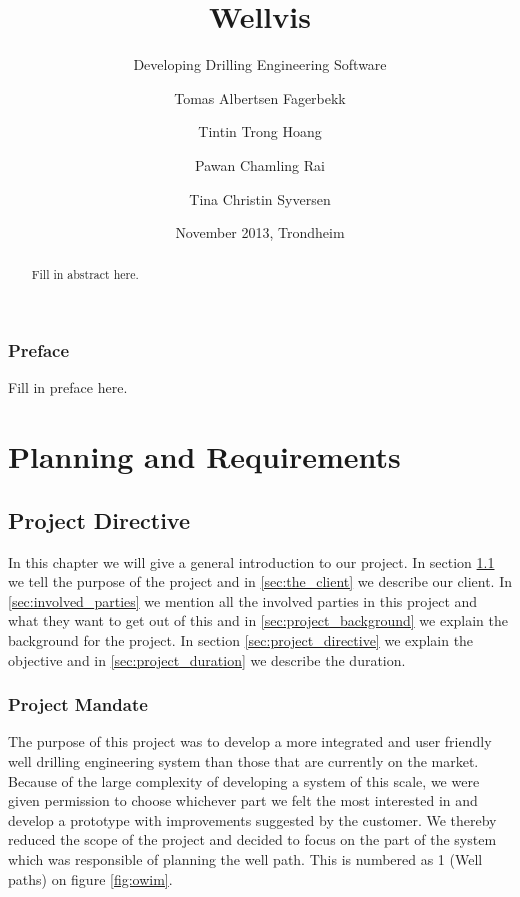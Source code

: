 \documentclass{report}
\title{Wellvis}
\subtitle{Developing Drilling Engineering Software}
\author{Tomas Albertsen Fagerbekk \and Tintin Trong Hoang \and Pawan Chamling Rai \and Tina Christin Syversen}
\date{November 2013, Trondheim}
\begin{document}
\maketitle

\section*{Preface}
Fill in preface here.

\begin{abstract}
Fill in abstract here.
\end{abstract}

\tableofcontents
{}
\listoffigures
{}
\listoftables
{}
\clearpage

\part{Planning and Requirements}

\chapter{Project Directive} \label{cha:project_directive}
In this chapter we will give a general introduction to our project. In section \ref{sec:project_mandate} we tell the purpose of the project and in \ref{sec:the_client} we describe our client. In \ref{sec:involved_parties} we mention all the involved parties in this project and what they want to get out of this and in \ref{sec:project_background} we explain the background for the project. In section \ref{sec:project_directive} we explain the objective and in \ref{sec:project_duration} we describe the duration.

\section{Project Mandate} \label{sec:project_mandate}
The purpose of this project was to develop a more integrated and user friendly well drilling engineering system than those that are currently on the market. Because of the large complexity of developing a system of this scale, we were given permission to choose whichever part we felt the most interested in and develop a prototype with improvements suggested by the customer. We thereby reduced the scope of the project and decided to focus on the part of the system which was responsible of planning the well path. This is numbered as 1 (Well paths) on figure \ref{fig:owim}.
\end{document}

